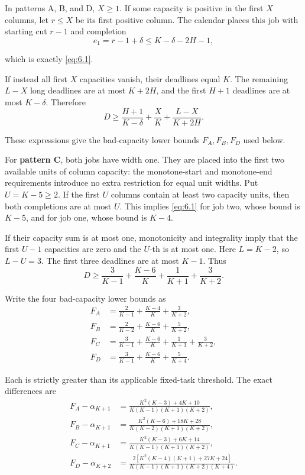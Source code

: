\documentclass[11pt,a4paper]{article}
\begin{document}
In patterns A, B, and D, \(X\ge 1\). If some capacity is positive in the first \(X\) columns, let \(r\le X\) be its first positive column. The calendar places this job with starting cut \(r-1\) and completion
\[
 e_1=r-1+\delta
 \le K-\delta-2H-1,
\]

which is exactly \eqref{eq:6.1}.

If instead all first \(X\) capacities vanish, their deadlines equal \(K\). The remaining \(L-X\) long deadlines are at most \(K+2H\), and the first \(H+1\) deadlines are at most \(K-\delta\). Therefore
\begin{equation}
D\ge\frac{H+1}{K-\delta}+\frac XK
                +\frac{L-X}{K+2H}.
\tag{9.17}
\label{eq:9.17}
\end{equation}

These expressions give the bad-capacity lower bounds \(F_A,F_B,F_D\) used below.

For \textbf{pattern C}, both jobs have width one. They are placed into the first two available units of column capacity: the monotone-start and monotone-end requirements introduce no extra restriction for equal unit widths. Put \(U=K-5\ge 2\). If the first \(U\) columns contain at least two capacity units, then both completions are at most \(U\). This implies \eqref{eq:6.1} for job two, whose bound is \(K-5\), and for job one, whose bound is \(K-4\).

If their capacity sum is at most one, monotonicity and integrality imply that the first \(U-1\) capacities are zero and the \(U\)-th is at most one. Here \(L=K-2\), so \(L-U=3\). The first three deadlines are at most \(K-1\). Thus
\begin{equation}
D\ge\frac3{K-1}+\frac{K-6}{K}
                   +\frac1{K+1}+\frac3{K+2}.
\tag{9.18}
\label{eq:9.18}
\end{equation}

Write the four bad-capacity lower bounds as
\[
\begin{aligned}
F_A&=\frac2{K-1}+\frac{K-4}{K}+\frac3{K+2},\\
F_B&=\frac2{K-2}+\frac{K-6}{K}+\frac5{K+2},\\
F_C&=\frac3{K-1}+\frac{K-6}{K}+\frac1{K+1}+\frac3{K+2},\\
F_D&=\frac3{K-1}+\frac{K-6}{K}+\frac5{K+4}.
\end{aligned}
\]

Each is strictly greater than its applicable fixed-task threshold. The exact differences are
\begin{equation}
\begin{aligned}
F_A-\alpha_{K+1}
 &=\frac{K^2(K-3)+4K+10}{K(K-1)(K+1)(K+2)},\\
F_B-\alpha_{K+1}
 &=\frac{K^2(K-6)+18K+28}{K(K-2)(K+1)(K+2)},\\
F_C-\alpha_{K+1}
 &=\frac{K^2(K-3)+6K+14}{K(K-1)(K+1)(K+2)},\\
F_D-\alpha_{K+2}
 &=\frac{2[K^2(K-4)(K+1)+27K+24]}{K(K-1)(K+1)(K+2)(K+4)}.
\end{aligned}
\tag{9.19}
\label{eq:9.19}
\end{equation}
\end{document}
